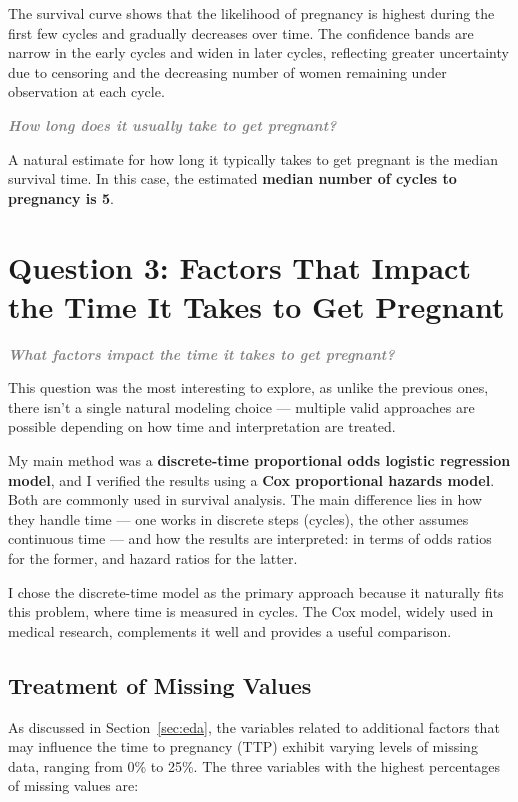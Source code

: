 \documentclass[11pt]{article}
\newcommand{\questiontext}[1]{\vspace{0.5em}\textbf{\textit{\textcolor{gray}{#1}}}}
\begin{document}
The survival curve shows that the likelihood of pregnancy is highest during the first few cycles and gradually decreases over time. The confidence bands are narrow in the early cycles and widen in later cycles, reflecting greater uncertainty due to censoring and the decreasing number of women remaining under observation at each cycle.

\questiontext{How long does it usually take to get pregnant?}

A natural estimate for how long it typically takes to get pregnant is the median survival time. In this case, the estimated \textbf{median number of cycles to pregnancy is 5}. 


\section{Question 3: Factors That Impact the Time It Takes to Get Pregnant}
\label{sec:other_factors}

\questiontext{What factors impact the time it takes to get pregnant?}

This question was the most interesting to explore, as unlike the previous ones, there isn’t a single natural modeling choice — multiple valid approaches are possible depending on how time and interpretation are treated.

My main method was a \textbf{discrete-time proportional odds logistic regression model}, and I verified the results using a \textbf{Cox proportional hazards model}. Both are commonly used in survival analysis. The main difference lies in how they handle time — one works in discrete steps (cycles), the other assumes continuous time — and how the results are interpreted: in terms of odds ratios for the former, and hazard ratios for the latter.

I chose the discrete-time model as the primary approach because it naturally fits this problem, where time is measured in cycles. The Cox model, widely used in medical research, complements it well and provides a useful comparison.


\subsection{Treatment of Missing Values}

As discussed in Section~\ref{sec:eda}, the variables related to additional factors that may influence the time to pregnancy (TTP) exhibit varying levels of missing data, ranging from 0\% to 25\%. The three variables with the highest percentages of missing values are:
\end{document}
